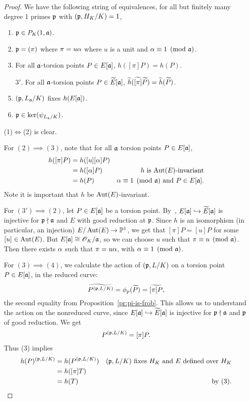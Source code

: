 \begin{proof}
We have the following string of equivalences, for all but finitely many degree 1 primes $\mathfrak{p}$ with $(\mathfrak{p},H_K/K)=1$,
\begin{enumerate}
\item
$\mathfrak{p}\in P_K(1,\mathfrak{a})$.
\item
$\mathfrak{p}=(\pi)$ where $\pi=u\alpha$ where $u$ is a unit and $\alpha\equiv 1\pmod{\mathfrak{a}}$.
\item For all $\mathfrak{a}$-torsion points $P\in E[\mathfrak{a}]$, 
$h([\pi]P)=h(P)$.
\item[$3'$.] For all $\mathfrak{a}$-torsion points $P\in \widetilde{E}[\mathfrak{a}]$, 
$\widetilde{h}(\widetilde{[\pi]}\widetilde{P})=\widetilde{h}(\widetilde{P})$.
\item
$(\mathfrak{p},L_{\mathfrak{a}}/K)$ fixes $h(E[\mathfrak{a}])$.
\item
$\mathfrak{p}\in \ker(\psi_{L_{\mathfrak{a}}/K})$.
\end{enumerate}
(1)$\iff$(2) is clear.

For $(2)\implies (3)$, note that for all $\mathfrak{a}$ torsion points $P\in E[\mathfrak{a}]$, %
\begin{align*}
h([\pi]P)
&=h([u][\alpha]P)\\
&=h([\alpha]P)&\text{$h$ is $\operatorname{Aut}(E)$-invariant}\\
&=h(P)&\alpha\equiv 1\pmod{\mathfrak{a}}\text{ and }P\in E[\mathfrak{a}].
\end{align*}
Note it is important that $h$ be $\operatorname{Aut}(E)$-invariant.

For $(3')\implies (2)$, let $P\in E[\mathfrak{a}]$ be a torsion point. By~\cite[VII.3.1b]{Si86}, $E[\mathfrak{a}]\hookrightarrow \widetilde{E}[\mathfrak{a}]$ is injective for $\mathfrak{p}\nmid \mathfrak{a}$ and $E$ with good reduction at $\mathfrak{p}$. Since $h$ is an isomorphism (in particular, an injection) $E/\operatorname{Aut}(E)\to \mathbb{P}^1$, we get that $[\pi]P= [u]P$ for some $[u]\in \operatorname{Aut}(E)$. 
But $E[\mathfrak{a}]\cong \mathscr{O}_K/\mathfrak{a}$, so we can choose $u$ such that $\pi\equiv u\pmod{\mathfrak{a}}$. Then there exists $\alpha$ such that $\pi=u\alpha$, with $\alpha\equiv 1\pmod{\mathfrak{a}}$.

For $(3)\implies (4)$, we calculate the action of $(\mathfrak{p},L/K)$ on a torsion point $P\in E[\mathfrak{a}]$, in the reduced curve:
\[
\widetilde{P^{(\mathfrak{p},L/K)}}=\phi_p(\widetilde{P})=\widetilde{[\pi]P},
\]
the second equality from Proposition~\ref{pr:pi-is-frob}. This allows us to understand the action on the nonreduced curve, since $E[\mathfrak{a}]\hookrightarrow\widetilde{E}[\mathfrak{a}]$ is injective for $\mathfrak{p}\nmid \mathfrak{a}$ and $\mathfrak{p}$ of good reduction. We get
\[
P^{(\mathfrak{p},L/K)}=[\pi]P.
\]
Thus (3) implies 
\begin{align*}
h(P)^{(\mathfrak{p},L/K)}&= h(P^{(\mathfrak{p},L/K)})&\text{$(\mathfrak{p},L/K)$ fixes $H_K$ and $E$ defined over $H_K$}\\
&=h([\pi]T)\\
&=h(T)&\text{by (3)}.
\end{align*}


\end{proof}

